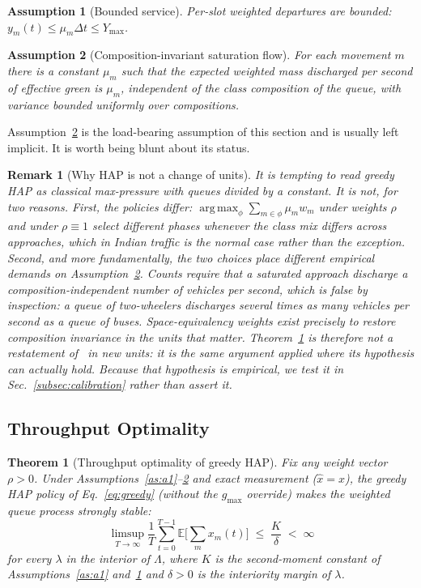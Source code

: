 \documentclass[journal]{IEEEtran}
\newtheorem{theorem}{Theorem}
\newtheorem{assumption}{Assumption}
\newtheorem{remark}{Remark}
\DeclareMathOperator*{\argmax}{arg\,max}
\begin{document}
\begin{assumption}[Bounded service]\label{as:a4}
Per-slot weighted departures are bounded:
$y_m(t) \le \mu_m \Delta t \le Y_{\max}$.
\end{assumption}

\begin{assumption}[Composition-invariant saturation flow]\label{as:a5}
For each movement $m$ there is a constant $\mu_m$ such that the expected
weighted mass discharged per second of effective green is $\mu_m$,
independent of the class composition of the queue, with variance bounded
uniformly over compositions.
\end{assumption}

Assumption~\ref{as:a5} is the load-bearing assumption of this section and
is usually left implicit. It is worth being blunt about its status.

\begin{remark}[Why HAP is not a change of units]
\label{rem:notunits}
It is tempting to read greedy HAP as classical max-pressure with queues
divided by a constant. It is not, for two reasons. First, the policies
differ: $\argmax_\phi \sum_{m\in\phi}\mu_m w_m$ under weights $\rho$ and
under $\rho\equiv1$ select different phases whenever the class mix
differs across approaches, which in Indian traffic is the normal case
rather than the exception. Second, and more fundamentally, the two
choices place \emph{different empirical demands} on
Assumption~\ref{as:a5}. Counts require that a saturated approach
discharge a composition-independent number of \emph{vehicles} per second,
which is false by inspection: a queue of two-wheelers discharges several
times as many vehicles per second as a queue of buses. Space-equivalency
weights exist precisely to restore composition invariance in the units
that matter. Theorem~\ref{thm:stability} is therefore not a restatement
of~\cite{b_varaiya} in new units: it is the same argument applied where
its hypothesis can actually hold. Because that hypothesis is empirical,
we test it in Sec.~\ref{subsec:calibration} rather than assert it.
\end{remark}

\subsection{Throughput Optimality}

\begin{theorem}[Throughput optimality of greedy HAP]
\label{thm:stability}
Fix any weight vector $\rho > 0$. Under
Assumptions~\ref{as:a1}--\ref{as:a5} and exact measurement
($\hat{x}=x$), the greedy HAP policy of Eq.~\eqref{eq:greedy} (without
the $g_{\max}$ override) makes the weighted queue process strongly
stable:
\begin{equation}
\limsup_{T\to\infty} \frac{1}{T}\sum_{t=0}^{T-1}
\mathbb{E}\Big[\sum_m x_m(t)\Big] \;\le\; \frac{K}{\delta} \;<\; \infty
\label{eq:stability}
\end{equation}
for every $\lambda$ in the interior of $\Lambda$, where $K$ is the
second-moment constant of Assumptions~\ref{as:a1} and~\ref{as:a4} and
$\delta>0$ is the interiority margin of $\lambda$.
\end{theorem}
\end{document}
